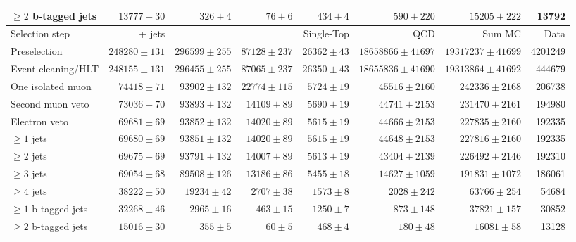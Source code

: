\begin{table}
{\begin{tabular}{lrrrrrrr}
	$\geq 2$ b-tagged jets  &  $13777 \pm 30$ &  $326 \pm 4$ &  $76 \pm 6$ &  $434 \pm 4$ &  $590 \pm 220$ &  $15205 \pm 222$ &  13792 \\ 
	\hline
	\hline
	Selection step & \ttbar + jets & \WpJets & \ZpJets & Single-Top & QCD & Sum MC & Data \\
	\hline
	Preselection  &  $248280 \pm 131$ &  $296599 \pm 255$ &  $87128 \pm 237$ &  $26362 \pm 43$ &  $18658866 \pm 41697$ &  $19317237 \pm 41699$ &  4201249 \\ 
	Event cleaning/HLT  &  $248155 \pm 131$ &  $296455 \pm 255$ &  $87065 \pm 237$ &  $26350 \pm 43$ &  $18655836 \pm 41690$ &  $19313864 \pm 41692$ &  444679 \\ 
	One isolated muon  &  $74418 \pm 71$ &  $93902 \pm 132$ &  $22774 \pm 115$ &  $5724 \pm 19$ &  $45516 \pm 2160$ &  $242336 \pm 2168$ &  206738 \\ 
	Second muon veto  &  $73036 \pm 70$ &  $93893 \pm 132$ &  $14109 \pm 89$ &  $5690 \pm 19$ &  $44741 \pm 2153$ &  $231470 \pm 2161$ &  194980 \\ 
	Electron veto  &  $69681 \pm 69$ &  $93852 \pm 132$ &  $14020 \pm 89$ &  $5615 \pm 19$ &  $44666 \pm 2153$ &  $227835 \pm 2160$ &  192335 \\ 
	$\geq 1$ jets  &  $69680 \pm 69$ &  $93851 \pm 132$ &  $14020 \pm 89$ &  $5615 \pm 19$ &  $44648 \pm 2153$ &  $227816 \pm 2160$ &  192335 \\ 
	$\geq 2$ jets  &  $69675 \pm 69$ &  $93791 \pm 132$ &  $14007 \pm 89$ &  $5613 \pm 19$ &  $43404 \pm 2139$ &  $226492 \pm 2146$ &  192310 \\ 
	$\geq 3$ jets  &  $69054 \pm 68$ &  $89508 \pm 126$ &  $13186 \pm 86$ &  $5455 \pm 18$ &  $14627 \pm 1059$ &  $191831 \pm 1072$ &  186061 \\ 
	$\geq 4$ jets  &  $38222 \pm 50$ &  $19234 \pm 42$ &  $2707 \pm 38$ &  $1573 \pm 8$ &  $2028 \pm 242$ &  $63766 \pm 254$ &  54684 \\ 
	$\geq 1$ b-tagged jets  &  $32268 \pm 46$ &  $2965 \pm 16$ &  $463 \pm 15$ &  $1250 \pm 7$ &  $873 \pm 148$ &  $37821 \pm 157$ &  30852 \\ 
	$\geq 2$ b-tagged jets  &  $15016 \pm 30$ &  $355 \pm 5$ &  $60 \pm 5$ &  $468 \pm 4$ &  $180 \pm 48$ &  $16081 \pm 58$ &  13128 \\ 
	\hline
	\hline
	\end{tabular}
	}
\end{table}

